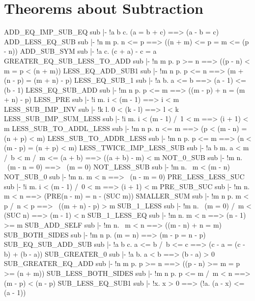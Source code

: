 \section{Theorems about Subtraction}
\THEOREM ADD\_EQ\_IMP\_SUB\_EQ sub
|- !a b c. (a = b + c) ==> (a - b = c)
\ENDTHEOREM
\THEOREM ADD\_LESS\_EQ\_SUB sub
|- !n m p. n <= p ==> ((n + m) <= p = m <= (p - n))
\ENDTHEOREM
\THEOREM ADD\_SUB\_SYM sub
|- !a c. (c + a) - c = a
\ENDTHEOREM
\THEOREM GREATER\_EQ\_SUB\_LESS\_TO\_ADD sub
|- !n m p. p >= n ==> ((p - n) < m = p < (n + m))
\ENDTHEOREM
\THEOREM LESS\_EQ\_ADD\_SUB1 sub
|- !m n p. p <= n ==> (m + (n - p) = (m + n) - p)
\ENDTHEOREM
\THEOREM LESS\_EQ\_SUB\_1 sub
|- !a b. a <= b ==> (a - 1) <= (b - 1)
\ENDTHEOREM
\THEOREM LESS\_EQ\_SUB\_ADD sub
|- !m n p. p <= m ==> ((m - p) + n = (m + n) - p)
\ENDTHEOREM
\THEOREM LESS\_PRE sub
|- !i m. i < (m - 1) ==> i < m
\ENDTHEOREM
\THEOREM LESS\_SUB\_IMP\_INV sub
|- !k l. 0 < (k - l) ==> l < k
\ENDTHEOREM
\THEOREM LESS\_SUB\_IMP\_SUM\_LESS sub
|- !i m. i < (m - 1) /\ 1 < m ==> (i + 1) < m
\ENDTHEOREM
\THEOREM LESS\_SUB\_TO\_ADDL\_LESS sub
|- !m n p. n <= m ==> (p < (m - n) = (n + p) < m)
\ENDTHEOREM
\THEOREM LESS\_SUB\_TO\_ADDR\_LESS sub
|- !m n p. p <= m ==> (n < (m - p) = (n + p) < m)
\ENDTHEOREM
\THEOREM LESS\_TWICE\_IMP\_LESS\_SUB sub
|- !a b m. a < m /\ b < m /\ m <= (a + b) ==> ((a + b) - m) < m
\ENDTHEOREM
\THEOREM NOT\_0\_SUB sub
|- !m n. ~(m - n = 0) ==> ~(m = 0)
\ENDTHEOREM
\THEOREM NOT\_LESS\_SUB sub
|- !m n. ~m < (m - n)
\ENDTHEOREM
\THEOREM NOT\_SUB\_0 sub
|- !m n. m < n ==> ~(n - m = 0)
\ENDTHEOREM
\THEOREM PRE\_LESS\_LESS\_SUC sub
|- !i m. i < (m - 1) /\ 0 < m ==> (i + 1) < m
\ENDTHEOREM
\THEOREM PRE\_SUB\_SUC sub
|- !m n. m < n ==> (PRE(n - m) = n - (SUC m))
\ENDTHEOREM
\THEOREM SMALLER\_SUM sub
|- !m n p. m < p /\ n < p ==> ~((m + n) - p) > m
\ENDTHEOREM
\THEOREM SUB\_1\_LESS sub
|- !m n. ~(m = 0) /\ m < (SUC n) ==> (m - 1) < n
\ENDTHEOREM
\THEOREM SUB\_1\_LESS\_EQ sub
|- !m n. m < n ==> (n - 1) >= m
\ENDTHEOREM
\THEOREM SUB\_ADD\_SELF sub
|- !m n. ~m < n ==> ((m - n) + n = m)
\ENDTHEOREM
\THEOREM SUB\_BOTH\_SIDES sub
|- !m n p. (m = n) ==> (m - p = n - p)
\ENDTHEOREM
\THEOREM SUB\_EQ\_SUB\_ADD\_SUB sub
|- !a b c. a <= b /\ b <= c ==> (c - a = (c - b) + (b - a))
\ENDTHEOREM
\THEOREM SUB\_GREATER\_0 sub
|- !a b. a < b ==> (b - a) > 0
\ENDTHEOREM
\THEOREM SUB\_GREATER\_EQ\_ADD sub
|- !n m p. p >= n ==> ((p - n) >= m = p >= (n + m))
\ENDTHEOREM
\THEOREM SUB\_LESS\_BOTH\_SIDES sub
|- !m n p. p <= m /\ m < n ==> (m - p) < (n - p)
\ENDTHEOREM
\THEOREM SUB\_LESS\_EQ\_SUB1 sub
|- !x. x > 0 ==> (!a. (a - x) <= (a - 1))

